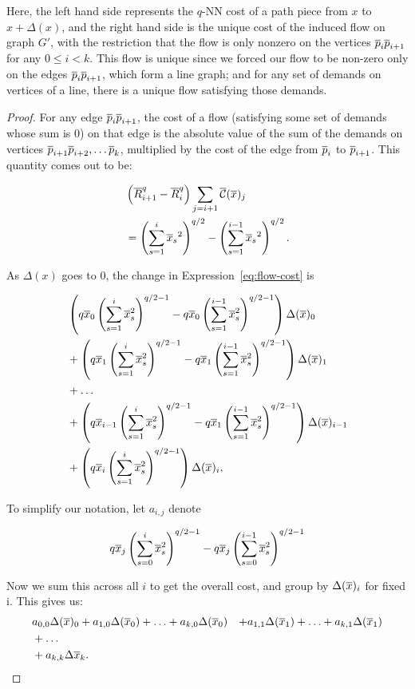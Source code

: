 Here, the left hand side represents the $q$-NN cost of a path piece from
$x$ to $x+\Delta(x)$, and the right hand side is the unique cost of the
induced flow on graph $G'$, with the restriction that the flow is only
nonzero on the vertices $\overline{p}_i\overline{p}_{i+1}$ for any $0 \leq i < k$. This flow
is unique since we forced our flow to be non-zero only on the edges
$\overline{p}_i\overline{p}_{i+1}$, which form a line graph; and for any set of demands on
vertices of a line, there is a unique flow satisfying those demands.

\begin{proof} For any edge $\overline{p}_i\overline{p}_{i+1}$, the cost of a flow (satisfying
some set of demands whose sum is $0$) on that edge is the absolute value of
the sum of the demands on vertices $\overline{p}_{i+1} \overline{p}_{i+2}, \ldots \overline{p}_k$,
multiplied by the cost of the edge from $\overline{p}_i$ to $\overline{p}_{i+1}$. This
quantity comes out to be:

\begin{align} &\left(\overline{R}_{i+1}^q-\overline{R}_{i}^q \right) \sum_{j=i+1} \overline{\mathcal{C}}(\overline{x})_j
\\
\label{eq:flow-cost}
&=\left(\sum_{s=1}^i {\overline{x}_s}^2\right)^{q/2} -\left(\sum_{s=1}^{i-1}
{\overline{x}_s}^2\right)^{q/2}.
\end{align}

As $\Delta(x)$ goes to $0$, the change in Expression~\ref{eq:flow-cost} is

\begin{align}
&
\left(q\overline{x}_0 \left(\sum_{s=1}^i \overline{x}_s^2 \right)^{q/2-1} -
q\overline{x}_0\left(\sum_{s=1}^{i-1} \overline{x}_s^2 \right)^{q/2-1} \right) \Delta(\overline{x})_0
\\
&+
\left(q\overline{x}_1 \left(\sum_{s=1}^i \overline{x}_s^2 \right)^{q/2-1} -
q\overline{x}_1\left(\sum_{s=1}^{i-1}\overline{x}_s^2 \right)^{q/2-1} \right) \Delta(\overline{x})_1
\\
&+ \ldots
\\
&+
\left(q\overline{x}_{i-1} \left(\sum_{s=1}^i \overline{x}_s^2 \right)^{q/2-1} -
q\overline{x}_1\left(\sum_{s=1}^{i-1}\overline{x}_s^2 \right)^{q/2-1}
\right)\Delta(\overline{x})_{i-1}
\\
&+
\left(q\overline{x}_i \left(\sum_{s=1}^i \overline{x}_s^2
\right)^{q/2-1}\right)\Delta(\overline{x})_i,
\end{align}

To simplify our notation, let $a_{i,j}$ denote

\[
q\overline{x}_j\left(\sum_{s=0}^i \overline{x}_s^2\right)^{q/2-1} - q\overline{x}_j\left(\sum_{s=0}^{i-1}
\overline{x}_s^2 \right)^{q/2-1}
\]

Now we sum this across all $i$ to get the overall cost, and group by
$\Delta(\overline{x})_i$ for fixed i. This gives us:
\begin{align}
&a_{0,0} \Delta(\overline{x})_0 + a_{1,0} \Delta(\overline{x}_0) + \ldots + a_{k, 0}
\Delta(\overline{x}_0)
&+a_{1,1} \Delta(\overline{x}_1) + \ldots + a_{k, 1} \Delta(\overline{x}_1)
\\
&+ \ldots 
\\
&+ a_{k,k} \Delta{\overline{x}_k}.
\end{align}


\end{proof}
